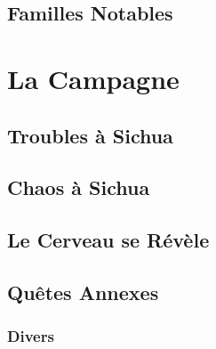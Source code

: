 \documentclass{dd}
\begin{document}
















\chapter{Familles Notables}



\part{La Campagne}


\chapter{Troubles à Sichua}



\chapter{Chaos à Sichua}


\chapter{Le Cerveau se Révèle}


\chapter{Quêtes Annexes}



\section{Divers}

\end{document}
